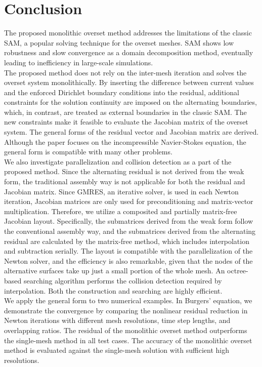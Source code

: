 \documentclass[preprint,12pt,sort&compress]{elsarticle}
\theoremstyle{definition}%
\begin{document}
\section{Conclusion}\label{sec:conclusion}
The proposed monolithic overset method addresses the limitations of the classic SAM, a popular solving technique for the overset
meshes. SAM shows low robustness and slow convergence as a domain decomposition method, eventually leading to inefficiency in
large-scale simulations.\\
The proposed method does not rely on the inter-mesh iteration and solves the overset system monolithically. By inserting the difference between
current values and the enforced Dirichlet boundary conditions into the residual, additional constraints for the solution continuity
are imposed on the alternating boundaries, which, in contrast, are treated as external boundaries in the classic SAM. The new constraints
make it feasible to evaluate the Jacobian matrix of the overset system. The general forms of the residual vector and Jacobian matrix 
are derived. Although the paper focuses on the incompressible Navier-Stokes equation,  the general form is compatible with many other problems.\\
We also investigate parallelization and collision detection as a part of the proposed method. Since the alternating residual is not derived from the weak form, the 
traditional assembly way is not applicable for both the residual and Jacobian matrix. Since GMRES, an iterative solver, is used
in each Newton iteration, Jacobian matrices are only used for preconditioning and matrix-vector multiplication. Therefore, we utilize a
composited and partially matrix-free Jacobian layout. Specifically, the submatrices derived from the weak form follow the conventional
assembly way, and the submatrices derived from the alternating residual are calculated by the matrix-free method, which includes interpolation
and subtraction serially. The layout is compatible with the parallelization of the Newton solver, and the efficiency is also remarkable,
given that the nodes of the alternative surfaces take up just a small portion of the whole mesh. An octree-based searching algorithm performs the collision detection required by interpolation. Both the construction and searching are highly efficient.\\
We apply the general form to two numerical examples. In Burgers' equation, we demonstrate the convergence by comparing the nonlinear 
residual reduction in Newton iterations with different mesh resolutions, time step lengths, and overlapping ratios. The residual of the monolithic overset method outperforms the single-mesh method in all test cases. The accuracy of the monolithic overset method is evaluated against the single-mesh solution with sufficient high resolutions.
\end{document}
